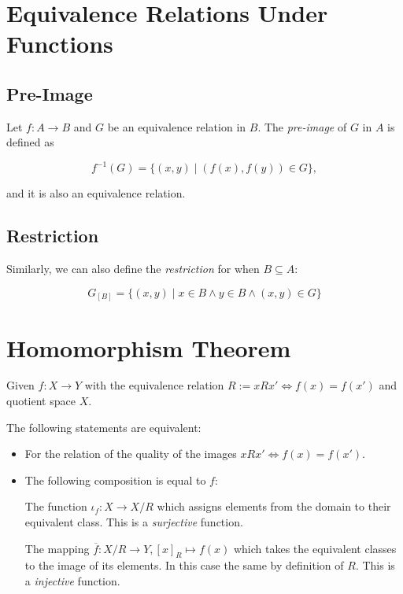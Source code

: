\section{Equivalence Relations Under Functions}

\subsection{Pre-Image}

Let \(f: A \to B\) and \(G\) be an equivalence relation in \(B\). The \emph{pre-image} of \(G\) in
\(A\) is defined as

\[
	f^{-1} (G) = \{(x, y) \mid (f(x), f(y)) \in G\},
\]

and it is also an equivalence relation.

\subsection{Restriction}

Similarly, we can also define the \emph{restriction} for when \(B \subseteq A\):

\[
	G_{[B]} = \{(x, y) \mid x \in B \land y \in B \land (x, y) \in G\}
\]

\section{Homomorphism Theorem}

Given \(f: X \to Y\) with the equivalence relation \(R := x R x' \iff f(x) = f(x')\) and quotient space \( X \).

The following statements are equivalent:


\begin{itemize}

	\item For the relation of the quality of the images \(xRx' \iff f(x) = f(x')\).

	\item The following composition is equal to \(f\):

	      \subitem The function \(\iota_f: X \to X / R\) which assigns elements from the domain to their equivalent class.
	      This is a \emph{surjective} function.

	      \subitem The mapping \(\overline{f}: X / R \to Y, [x]_R \mapsto f(x)\) which takes the equivalent classes to the image of its elements. In this case the same by
	      definition of \(R\). This is a \emph{injective} function.

\end{itemize}

